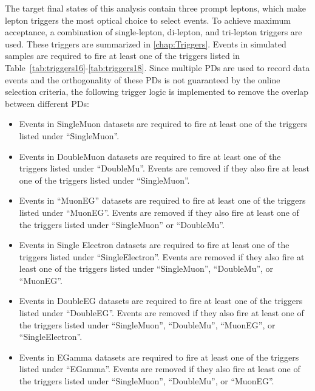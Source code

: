 The target final states of this analysis contain three prompt leptons, which make lepton triggers the most optical choice to select events. To achieve maximum acceptance, a combination of single-lepton, di-lepton, and tri-lepton triggers are used. These triggers are summarized in \autoref{chap:Triggers}. Events in simulated samples are required to fire at least one of the triggers listed in Table~\ref{tab:triggers16}-\ref{tab:triggers18}. Since multiple \acp{PD} are used to record data events and the orthogonality of these \acp{PD} is not guaranteed by the online selection criteria, the following trigger logic is implemented to remove the overlap between different \acp{PD}:

\begin{itemize}
\item Events in SingleMuon datasets are required to fire at least one of the triggers listed under ``SingleMuon''. 
\item Events in DoubleMuon datasets are required to fire at least one of the triggers listed under ``DoubleMu''. Events are removed if they also fire at least one of the triggers listed under ``SingleMuon''.
\item Events in ``MuonEG'' datasets are required to fire at least one of the triggers listed under ``MuonEG''. Events are removed if they also fire at least one of the triggers listed under ``SingleMuon'' or ``DoubleMu''.
\item Events in Single Electron datasets are required to fire at least one of the triggers listed under ``SingleElectron''. Events are removed if they also fire at least one of the triggers listed under ``SingleMuon'', ``DoubleMu'', or ``MuonEG''.
\item Events in DoubleEG datasets are required to fire at least one of the triggers listed under ``DoubleEG''. Events are removed if they also fire at least one of the triggers listed under ``SingleMuon'', ``DoubleMu'', ``MuonEG'', or ``SingleElectron''.
\item Events in EGamma datasets are required to fire at least one of the triggers listed under ``EGamma''. Events are removed if they also fire at least one of the triggers listed under ``SingleMuon'', ``DoubleMu'', or ``MuonEG''.
\end{itemize}
